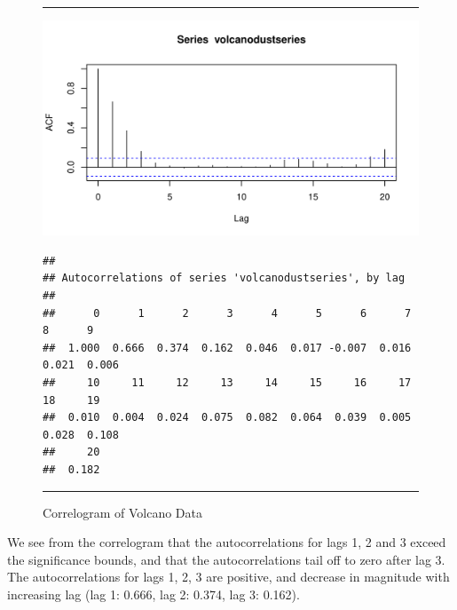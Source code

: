 \documentclass[11pt, letterpaper, twoside]{memoir}\usepackage{knitr}
\begin{document}
\begin{figure}
\centering
\rule{4in}{1pt}
\begin{knitrout}
\color{fgcolor}\begin{kframe}
\begin{alltt}
 \hlstd{=}\hlstd{)}
\end{alltt}
\end{kframe}
\includegraphics[width=\maxwidth]{figure/unnamed-chunk-123-1} 
\begin{kframe}\begin{alltt}
 \hlstd{=}\hlstd{,} \hlstd{=}\hlstd{)}
\end{alltt}
\begin{verbatim}
## 
## Autocorrelations of series 'volcanodustseries', by lag
## 
##      0      1      2      3      4      5      6      7      8      9 
##  1.000  0.666  0.374  0.162  0.046  0.017 -0.007  0.016  0.021  0.006 
##     10     11     12     13     14     15     16     17     18     19 
##  0.010  0.004  0.024  0.075  0.082  0.064  0.039  0.005  0.028  0.108 
##     20 
##  0.182
\end{verbatim}
\end{kframe}
\end{knitrout}
\caption{Correlogram of Volcano Data}
\label{Fig:corvol}
\rule{4in}{1pt}
\end{figure}

We see from the correlogram that the autocorrelations for lags 1, 2 and 3 exceed the significance bounds, and that the autocorrelations tail off to zero after lag 3. The autocorrelations for lags 1, 2, 3 are positive, and decrease in magnitude with increasing lag (lag 1: 0.666, lag 2: 0.374, lag 3: 0.162).
\end{document}
